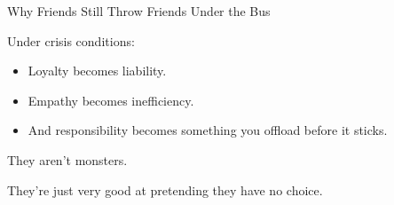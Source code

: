 \begin{PsychologicalSidebar}{Why Friends Still Throw Friends Under the Bus}
    \medskip
    
    Under crisis conditions:
    \begin{itemize}
        \item Loyalty becomes liability.
        \item Empathy becomes inefficiency.
        \item And responsibility becomes something you offload before it sticks.
    \end{itemize}
    
    \medskip
    
    They aren’t monsters.

    \medskip
    
    They’re just very good at pretending they have no choice.
    
\end{PsychologicalSidebar}
